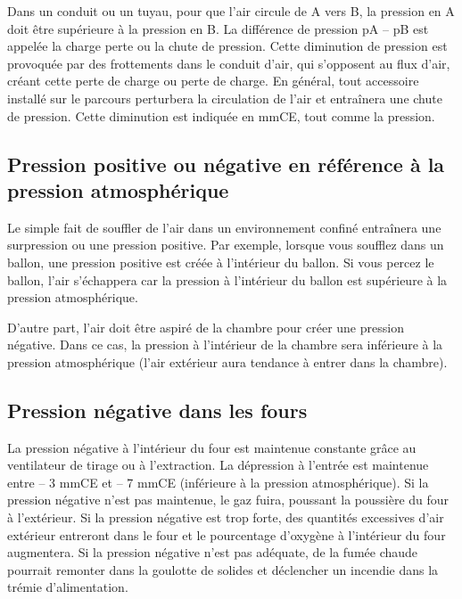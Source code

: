 Dans un conduit ou un tuyau, pour que l'air circule de A vers B, la pression en A doit être supérieure à la pression en B. La différence de pression pA – pB est appelée la charge perte ou la chute de pression.
\vspace{0.3cm}
Cette diminution de pression est provoquée par des frottements dans le conduit d'air, qui s'opposent au flux d'air, créant cette perte de charge ou perte de charge.
En général, tout accessoire installé sur le parcours perturbera la circulation de l'air et entraînera une chute de pression. Cette diminution est indiquée en mmCE, tout comme la pression.

\subsection{Pression positive ou négative en référence à la pression atmosphérique} 
\vspace{0.3cm}
Le simple fait de souffler de l'air dans un environnement confiné entraînera une surpression ou une pression positive.
Par exemple, lorsque vous soufflez dans un ballon, une pression positive est créée à l'intérieur du ballon. Si vous percez le ballon, l'air s'échappera car la pression à l'intérieur du ballon est supérieure à la pression atmosphérique.

\vspace{0.3cm}
D'autre part, l'air doit être aspiré de la chambre pour créer une pression négative. Dans ce cas, la pression à l'intérieur de la chambre sera inférieure à la pression atmosphérique (l'air extérieur aura tendance à entrer dans la chambre).


\subsection{Pression négative dans les fours}

La pression négative à l'intérieur du four est maintenue constante grâce au ventilateur de tirage ou à l'extraction.
\vspace{0.3cm}
La dépression à l'entrée est maintenue entre – 3 mmCE et – 7 mmCE (inférieure à la pression atmosphérique).
\vspace{0.3cm}
Si la pression négative n'est pas maintenue, le gaz fuira, poussant la poussière du four à l'extérieur.
\vspace{0.3cm}
Si la pression négative est trop forte, des quantités excessives d'air extérieur entreront dans le four et le pourcentage d'oxygène à l'intérieur du four augmentera.
\vspace{0.3cm}
Si la pression négative n'est pas adéquate, de la fumée chaude pourrait remonter dans la goulotte de solides et déclencher un incendie dans la trémie d'alimentation.







